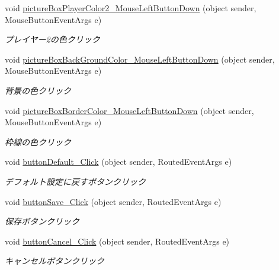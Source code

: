 \begin{DoxyCompactItemize}
void \hyperlink{class_reversi4color_wpf_1_1_setting_window_a19ec10790a7c71407fc0a67faf97978e}{picture\+Box\+Player\+Color2\+\_\+\+Mouse\+Left\+Button\+Down} (object sender, Mouse\+Button\+Event\+Args e)
\begin{DoxyCompactList}\small\item\em プレイヤー2の色クリック \end{DoxyCompactList}\item 
void \hyperlink{class_reversi4color_wpf_1_1_setting_window_a40fbee94e6f54854efe0e29d2e4252fb}{picture\+Box\+Back\+Ground\+Color\+\_\+\+Mouse\+Left\+Button\+Down} (object sender, Mouse\+Button\+Event\+Args e)
\begin{DoxyCompactList}\small\item\em 背景の色クリック \end{DoxyCompactList}\item 
void \hyperlink{class_reversi4color_wpf_1_1_setting_window_a22a2d7abed12e8360eb1b85f5af92268}{picture\+Box\+Border\+Color\+\_\+\+Mouse\+Left\+Button\+Down} (object sender, Mouse\+Button\+Event\+Args e)
\begin{DoxyCompactList}\small\item\em 枠線の色クリック \end{DoxyCompactList}\item 
void \hyperlink{class_reversi4color_wpf_1_1_setting_window_af2d7e447926127521d276807776c7bf0}{button\+Default\+\_\+\+Click} (object sender, Routed\+Event\+Args e)
\begin{DoxyCompactList}\small\item\em デフォルト設定に戻すボタンクリック \end{DoxyCompactList}\item 
void \hyperlink{class_reversi4color_wpf_1_1_setting_window_a6a6a1a2fd61463026678b72dabaf7729}{button\+Save\+\_\+\+Click} (object sender, Routed\+Event\+Args e)
\begin{DoxyCompactList}\small\item\em 保存ボタンクリック \end{DoxyCompactList}\item 
void \hyperlink{class_reversi4color_wpf_1_1_setting_window_afbcd7dd27bd8a753ef2d9f991880db6b}{button\+Cancel\+\_\+\+Click} (object sender, Routed\+Event\+Args e)
\begin{DoxyCompactList}\small\item\em キャンセルボタンクリック \end{DoxyCompactList}\end{DoxyCompactItemize}
